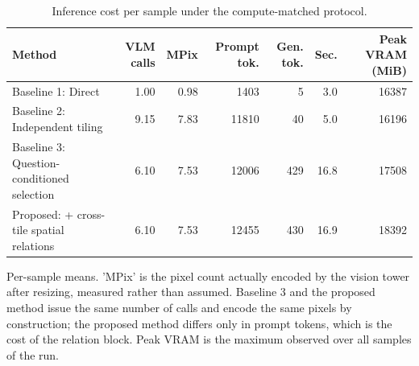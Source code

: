 \begin{table}[t]
\centering
\small
\begin{tabular}{lrrrrrr}
\toprule
Method & VLM calls & MPix & Prompt tok. & Gen. tok. & Sec. & Peak VRAM (MiB) \\
\midrule
Baseline 1: Direct & 1.00 & 0.98 & 1403 & 5 & 3.0 & 16387 \\
Baseline 2: Independent tiling & 9.15 & 7.83 & 11810 & 40 & 5.0 & 16196 \\
Baseline 3: Question-conditioned selection & 6.10 & 7.53 & 12006 & 429 & 16.8 & 17508 \\
Proposed: + cross-tile spatial relations & 6.10 & 7.53 & 12455 & 430 & 16.9 & 18392 \\
\bottomrule
\end{tabular}
\vspace{2pt}
\begin{minipage}{\linewidth}\footnotesize Per-sample means. 'MPix' is the pixel count actually encoded by the vision tower after resizing, measured rather than assumed. Baseline 3 and the proposed method issue the same number of calls and encode the same pixels by construction; the proposed method differs only in prompt tokens, which is the cost of the relation block. Peak VRAM is the maximum observed over all samples of the run.\end{minipage}
\caption{Inference cost per sample under the compute-matched protocol.}
\label{tab:compute}
\end{table}
